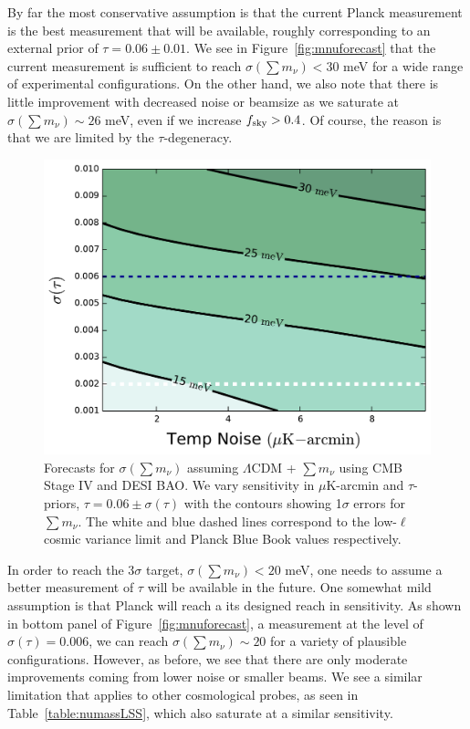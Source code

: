 By far the most conservative assumption is that the current Planck measurement is the best measurement that will be available, roughly corresponding to an external prior of $\tau = 0.06 \pm 0.01$.  We see in Figure~\ref{fig:mnuforecast}  that the current measurement is sufficient to reach $\sigma(\sum m_\nu) < 30$ meV for a wide range of experimental configurations.  On the other hand, we also note that there is little improvement with decreased noise or beamsize as we saturate at $\sigma(\sum m_\nu) \sim 26$ meV,  even if we increase $f_{\rm sky} >0.4$.  Of course, the reason is that we are limited by the $\tau$-degeneracy.


\begin{figure}[h!]
\begin{center}
\includegraphics[scale=0.6]{Neutrinos/Mnu_tauprior.pdf}

\caption{ Forecasts for $\sigma(\sum m_\nu)$ assuming $\Lambda$CDM + $\sum m_\nu$ using CMB Stage IV and DESI BAO.  We vary sensitivity in $\mu$K-arcmin and $\tau$-priors, $\tau = 0.06 \pm \sigma(\tau)$ with the contours showing 1$\sigma$ errors for $\sum m_\nu$.  The white and blue dashed lines correspond to the low-$\ell$ cosmic variance limit and Planck Blue Book values respectively. }
\label{fig:mnu_tau}
\end{center}
\end{figure} 

In order to reach the 3$\sigma$ target, $\sigma(\sum m_\nu) < 20$ meV, one needs to assume a better measurement of $\tau$ will be available in the future.  One somewhat mild assumption is that Planck will reach a its designed reach in sensitivity.  As shown in bottom panel of Figure~\ref{fig:mnuforecast}, a measurement at the level of $\sigma(\tau) = 0.006$, we can reach $\sigma(\sum m_\nu) \sim 20$ for a variety of plausible configurations.  However, as before, we see that there are only moderate improvements coming from lower noise or smaller beams.  We see a similar limitation that applies to other cosmological probes, as seen in Table~\ref{table:numassLSS}, which also saturate at a similar sensitivity.

